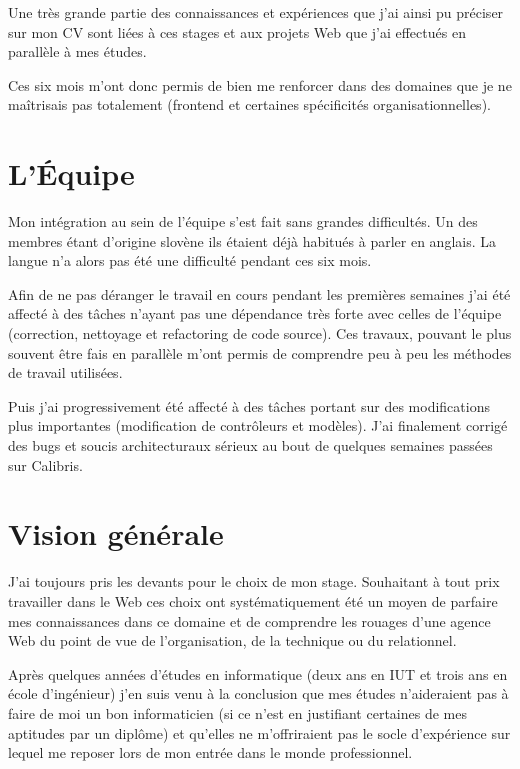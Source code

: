 \documentclass[12pt,a4paper]{book}
\begin{document}
Une très grande partie des connaissances et expériences que j'ai ainsi pu préciser sur mon CV sont liées à ces stages et aux projets Web que j'ai effectués en parallèle à mes études.

Ces six mois m'ont donc permis de bien me renforcer dans des domaines que je ne maîtrisais pas totalement (frontend et certaines spécificités organisationnelles).

\section{L'Équipe}

Mon intégration au sein de l'équipe s'est fait sans grandes difficultés. Un des membres étant d'origine slovène ils étaient déjà habitués à parler en anglais. La langue n'a alors pas été une difficulté pendant ces six mois.

Afin de ne pas déranger le travail en cours pendant les premières semaines j'ai été affecté à des tâches n'ayant pas une dépendance très forte avec celles de l'équipe (correction, nettoyage et refactoring de code source). Ces travaux, pouvant le plus souvent être fais en parallèle m'ont permis de comprendre peu à peu les méthodes de travail utilisées.

Puis j'ai progressivement été affecté à des tâches portant sur des modifications plus importantes (modification de contrôleurs et modèles). J'ai finalement corrigé des bugs et soucis architecturaux sérieux au bout de quelques semaines passées sur Calibris.

\section{Vision générale}

J'ai toujours pris les devants pour le choix de mon stage. Souhaitant à tout prix travailler dans le Web ces choix ont systématiquement été un moyen de parfaire mes connaissances dans ce domaine et de comprendre les rouages d'une agence Web du point de vue de l'organisation, de la technique ou du relationnel.

Après quelques années d'études en informatique (deux ans en IUT et trois ans en école d'ingénieur) j'en suis venu à la conclusion que mes études n'aideraient pas à faire de moi un bon informaticien (si ce n'est en justifiant certaines de mes aptitudes par un diplôme) et qu'elles ne m'offriraient pas le socle d'expérience sur lequel me reposer lors de mon entrée dans le monde professionnel.
\end{document}
